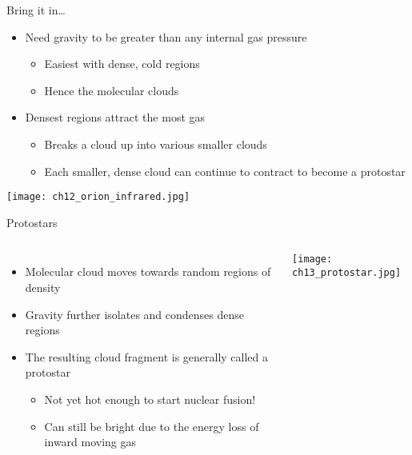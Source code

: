 \documentclass[pdf,aspectratio=169]{beamer}
\begin{document}

\begin{frame}{Bring it in\ldots}
  \begin{itemize}
	\item Need gravity to be greater than any internal gas pressure
	  \begin{itemize}
		\item Easiest with dense, cold regions
		\item Hence the molecular clouds
	  \end{itemize}
	\item Densest regions attract the most gas
	  \begin{itemize}
		\item Breaks a cloud up into various smaller clouds
		\item Each smaller, dense cloud can continue to contract to become a protostar
	  \end{itemize}
  \end{itemize}
  \begin{center}
	\texttt{[image: ch12\_orion\_infrared.jpg]}
  \end{center}
\end{frame}

\begin{frame}{Protostars}
  \begin{columns}
	\begin{itemize}
	  \item Molecular cloud moves towards random regions of density
	  \item Gravity further isolates and condenses dense regions
	  \item The resulting cloud fragment is generally called a \alert{protostar}
		\begin{itemize}
		  \item Not yet hot enough to start nuclear fusion!
		  \item Can still be bright due to the energy loss of inward moving gas
		\end{itemize}
	\end{itemize}
	\begin{center}
	  \texttt{[image: ch13\_protostar.jpg]}
	\end{center}
  \end{columns}
\end{frame}
\end{document}
